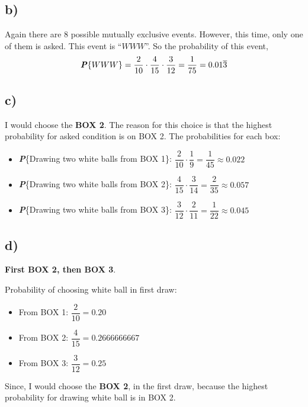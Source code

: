 \documentclass[12pt]{article}
\newcommand{\prob}[1]{\textbf{\textit{P}}\{#1\}}
\begin{document}
\subsection*{b)}

Again there are 8 possible mutually exclusive events. However, this time, only one of them is asked. This event is ``$WWW$''. So the probability of this event,
\begin{equation*}
    \prob{WWW} = \frac{2}{10} \cdot \frac{4}{15} \cdot \frac{3}{12} = \frac{1}{75} = 0.01\overline{3}
\end{equation*}

\subsection*{c)}

I would choose the \textbf{BOX 2}. The reason for this choice is that the highest probability for asked condition is on BOX 2. The probabilities for each box:

\begin{itemize}
    \item \prob{Drawing two white balls from BOX 1}: $\dfrac{2}{10} \cdot \dfrac{1}{9} = \dfrac{1}{45} \approx 0.022$
    \item \prob{Drawing two white balls from BOX 2}: $\dfrac{4}{15} \cdot \dfrac{3}{14} = \dfrac{2}{35} \approx 0.057$
    \item \prob{Drawing two white balls from BOX 3}: $\dfrac{3}{12} \cdot \dfrac{2}{11} = \dfrac{1}{22} \approx 0.045$
\end{itemize}

\subsection*{d)}

\textbf{First BOX 2, then BOX 3}.

\noindent Probability of choosing white ball in first draw:
\begin{itemize}
    \item From BOX 1: $\dfrac{2}{10} = 0.20$
    \item From BOX 2: $\dfrac{4}{15} = 0.2666666667$
    \item From BOX 3: $\dfrac{3}{12} = 0.25$
\end{itemize}

\noindent Since, I would choose the \textbf{BOX 2}, in the first draw, because the highest probability for drawing white ball is in BOX 2. 
\end{document}
